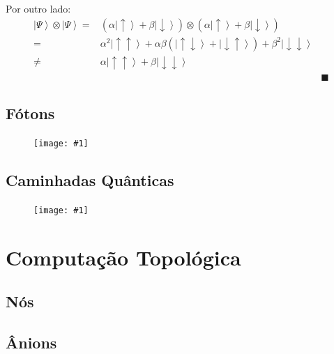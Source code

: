 \documentclass[t]{beamer}
\newcommand{\cqd}{\blacksquare}
\newcommand{\ket}[1]{\ensuremath{\left|#1\right\rangle}}
\newcommand{\imgw}[2]{%
\begin{center}
	\begin{figure}
	\texttt{[image: \#1]}\\
	\end{figure}
\end{center}
}
\begin{document}
	\begin{frame}{\subsecname}
	Por outro lado:
		\begin{align*}
		\ket{\Psi} \otimes \ket{\Psi} =& (\alpha \ket{\uparrow} + \beta \ket{\downarrow}) \otimes (\alpha \ket{\uparrow} + \beta \ket{\downarrow})\\
		=& \alpha^2 \ket{\uparrow\uparrow} + \alpha\beta (\ket{\uparrow\downarrow} + \ket{\downarrow\uparrow}) + \beta^2 \ket{\downarrow\downarrow}\\
		\neq& \alpha \ket{\uparrow\uparrow} + \beta \ket{\downarrow\downarrow}\\
		&& \cqd
		\end{align*}
	\end{frame}	
	
	\subsection{Fótons}	
	
	\begin{frame}{\subsecname}
		\imgw{superposition.pdf}{\textwidth}
	\end{frame}
	
	\subsection{Caminhadas Quânticas}
	
	\begin{frame}{\subsecname}
		\imgw{superposition.pdf}{\textwidth}
	\end{frame}

	\section{Computação Topológica}
	
	\subsection{Nós}
	
	\begin{frame}{\subsecname}
	
	\end{frame}	
	
	\begin{frame}{\subsecname}
	
	\end{frame}
	
	\subsection{Ânions}
	
\end{document}

